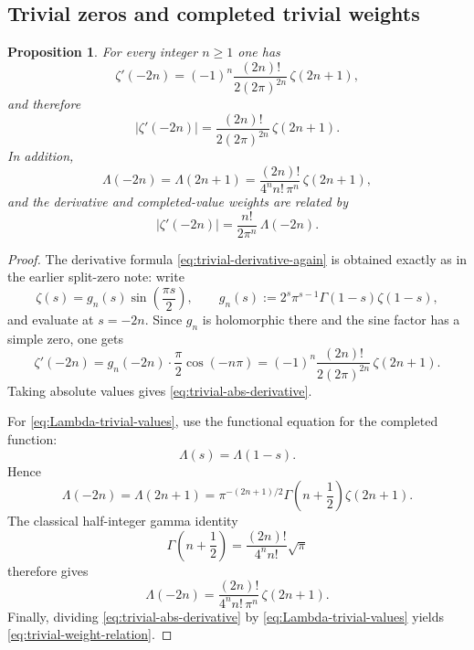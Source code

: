 \documentclass[11pt,a4paper]{article}
\numberwithin{equation}{section}
\newtheorem{proposition}[theorem]{Proposition}
\theoremstyle{definition}
\theoremstyle{remark}
\begin{document}
\subsection{Trivial zeros and completed trivial weights}

\begin{proposition}\label{prop:trivial-derivative-and-Lambda}
For every integer $n\ge 1$ one has
\begin{equation}\label{eq:trivial-derivative-again}
\zeta'(-2n)=(-1)^n\frac{(2n)!}{2(2\pi)^{2n}}\,\zeta(2n+1),
\end{equation}
and therefore
\begin{equation}\label{eq:trivial-abs-derivative}
\bigl|\zeta'(-2n)\bigr|=\frac{(2n)!}{2(2\pi)^{2n}}\,\zeta(2n+1).
\end{equation}
In addition,
\begin{equation}\label{eq:Lambda-trivial-values}
\Lambda(-2n)=\Lambda(2n+1)=\frac{(2n)!}{4^n n!\,\pi^n}\,\zeta(2n+1),
\end{equation}
and the derivative and completed-value weights are related by
\begin{equation}\label{eq:trivial-weight-relation}
\bigl|\zeta'(-2n)\bigr|=\frac{n!}{2\pi^n}\,\Lambda(-2n).
\end{equation}
\end{proposition}

\begin{proof}
The derivative formula \eqref{eq:trivial-derivative-again} is obtained exactly as in the earlier split-zero note: write
\[
\zeta(s)=g_n(s)\sin\!\left(\frac{\pi s}{2}\right),
\qquad
g_n(s):=2^s\pi^{s-1}\Gamma(1-s)\zeta(1-s),
\]
and evaluate at $s=-2n$.  Since $g_n$ is holomorphic there and the sine factor has a simple zero, one gets
\[
\zeta'(-2n)=g_n(-2n)\cdot \frac{\pi}{2}\cos(-n\pi)
=(-1)^n\frac{(2n)!}{2(2\pi)^{2n}}\,\zeta(2n+1).
\]
Taking absolute values gives \eqref{eq:trivial-abs-derivative}.

For \eqref{eq:Lambda-trivial-values}, use the functional equation for the completed function:
\[
\Lambda(s)=\Lambda(1-s).
\]
Hence
\[
\Lambda(-2n)=\Lambda(2n+1)=\pi^{-(2n+1)/2}\Gamma\!\left(n+\frac12\right)\zeta(2n+1).
\]
The classical half-integer gamma identity
\[
\Gamma\!\left(n+\frac12\right)=\frac{(2n)!}{4^n n!}\sqrt\pi
\]
therefore gives
\[
\Lambda(-2n)=\frac{(2n)!}{4^n n!\,\pi^n}\,\zeta(2n+1).
\]
Finally, dividing \eqref{eq:trivial-abs-derivative} by \eqref{eq:Lambda-trivial-values} yields \eqref{eq:trivial-weight-relation}.
\end{proof}
\end{document}
